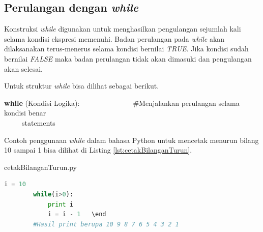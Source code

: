 \subsection{Perulangan dengan \textit{while}}
Konstruksi \textit{while} digunakan untuk menghasilkan pengulangan sejumlah kali selama kondisi ekspresi memenuhi. Badan perulangan pada \textit{while} akan dilaksanakan terus-menerus selama kondisi bernilai \textit{TRUE}. Jika kondisi sudah bernilai \textit{FALSE} maka badan perulangan tidak akan dimasuki dan pengulangan akan selesai.

\FloatBarrier
Untuk struktur \textit{while} bisa dilihat sebagai berikut.
\begin{tabbing}
\textbf{while} (Kondisi Logika):~~~~~~~~~~~~~~~\=\#Menjalankan perulangan selama kondisi benar\\
~~~~~statements\\
\end{tabbing}

Contoh penggunaan \textit{while} dalam bahasa Python untuk mencetak menurun bilang 10 sampai 1 bisa dilihat di Listing \ref{lst:cetakBilanganTurun}.
\begin{listprog}{cetakBilanganTurun.py}
	\label{lst:cetakBilanganTurun}
	\begin{lstlisting}[language=Python]
		i = 10
		while(i>0):
			print i
			i = i - 1	\end
		#Hasil print berupa 10 9 8 7 6 5 4 3 2 1
	\end{lstlisting}
\end{listprog}


